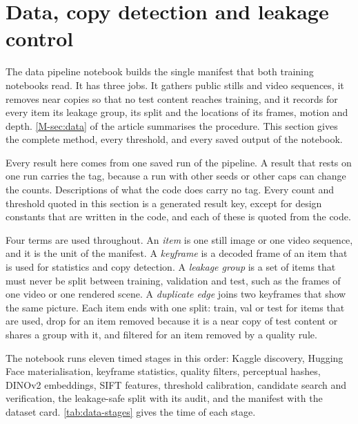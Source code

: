\section{Data, copy detection and leakage control}\label{sec:data}

The data pipeline notebook builds the single manifest that both training notebooks read. It has three jobs. It gathers public stills and video sequences, it removes near copies so that no test content reaches training, and it records for every item its leakage group, its split and the locations of its frames, motion and depth. \cref{M-sec:data} of the article summarises the procedure. This section gives the complete method, every threshold, and every saved output of the notebook.

Every result here comes from one saved run of the pipeline. A result that rests on one run carries the \Preliminary{} tag, because a run with other seeds or other caps can change the counts. Descriptions of what the code does carry no tag. Every count and threshold quoted in this section is a generated result key, except for design constants that are written in the code, and each of these is quoted from the code.

Four terms are used throughout. An \emph{item} is one still image or one video sequence, and it is the unit of the manifest. A \emph{keyframe} is a decoded frame of an item that is used for statistics and copy detection. A \emph{leakage group} is a set of items that must never be split between training, validation and test, such as the frames of one video or one rendered scene. A \emph{duplicate edge} joins two keyframes that show the same picture. Each item ends with one split: train, val or test for items that are used, drop for an item removed because it is a near copy of test content or shares a group with it, and filtered for an item removed by a quality rule.

The notebook runs eleven timed stages in this order: Kaggle discovery, Hugging Face materialisation, keyframe statistics, quality filters, perceptual hashes, DINOv2 embeddings, SIFT features, threshold calibration, candidate search and verification, the leakage-safe split with its audit, and the manifest with the dataset card. \cref{tab:data-stages} gives the time of each stage.

